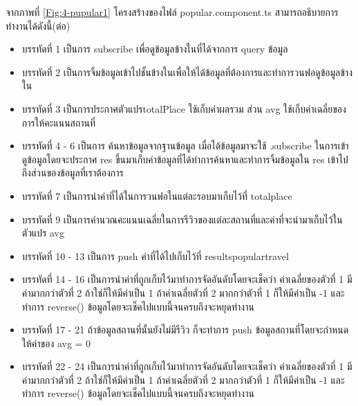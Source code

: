 จากภาพที่ \ref{Fig:4-pupular1} โครงสร้างของไฟล์ popular.component.ts สามารถอธิบายการทำงานได้ดังนี้(ต่อ)
\begin{itemize}[label={--}]
\item บรรทัดที่ 1 เป็นการ subscribe เพื่อดูข้อมูลข้างในที่ได้จากการ query ข้อมูล
\item บรรทัดที่ 2 เป็นการจิ้มข้อมูลเข้าไปชั้นข้างในเพื่อให้ได้ข้อมูลที่ต้องการและทำการวนฟอดูข้อมูลข้างใน
\item บรรทัดที่ 3 เป็นการประกาศตัวแปรtotalPlace ใช้เก็บค่าผลรวม ส่วน avg ใช้เก็บค่าเฉลี่ยของการให้คะแนนสถานที่
\item บรรทัดที่ 4 - 6 เป็นการ ค้นหาข้อมูลจากฐานข้อมูล เมื่อได้ข้อมูลมาจะใช้ .subscribe ในการเข้าดูข้อมูลโดยจะประกาศ res ขึ้นมาเก็บค่าข้อมูลที่ได้ทำการค้นหาและทำการจิ้มข้อมูลใน res เข้าไปถึงส่วนของข้อมูลที่เราต้องการ
\item บรรทัดที่ 7 เป็นการนำค่าที่ได้ในการวนฟอในแต่ละรอบมาเก็บไว้ที่ totalplace
\item บรรทัดที่ 9 เป็นการคำนวณคะแนนเฉลี่ยในการรีวิวของแต่ละสถานที่และค่าที่จะนำมาเก็บไว้ในตัวแปร avg
\item บรรทัดที่ 10 - 13 เป็นการ push ค่าที่ได้ไปเก็บไว้ที่ resultspopulartravel 
\item บรรทัดที่ 14 - 16 เป็นการนำค่าที่ถูกเก็บไว้มาทำการจัดอันดับโดยจะเช็คว่า ค่าเฉลี่ยของตัวที่ 1 มีค่ามากกว่าตัวที่ 2 ถ้าใช่ก็ให้มีค่าเป็น 1 ถ้าค่าเฉลี่ยตัวที่ 2 มากกว่าตัวที่ 1 ก็ให้มีค่าเป็น -1 และทำการ reverse() ข้อมูลโดยจะเช็คไปแบบนี้จนครบถึงจะหยุดทำงาน
\item บรรทัดที่ 17 - 21 ถ้าข้อมูลสถานที่นั้นยังไม่มีรีวิว ก็จะทำการ push ข้อมูลสถานที่โดยจะกำหนดให้ค่าของ avg = 0
\item บรรทัดที่ 22 - 24 เป็นการนำค่าที่ถูกเก็บไว้มาทำการจัดอันดับโดยจะเช็คว่า ค่าเฉลี่ยของตัวที่ 1 มีค่ามากกว่าตัวที่ 2 ถ้าใช่ก็ให้มีค่าเป็น 1 ถ้าค่าเฉลี่ยตัวที่ 2 มากกว่าตัวที่ 1 ก็ให้มีค่าเป็น -1 และทำการ reverse() ข้อมูลโดยจะเช็คไปแบบนี้จนครบถึงจะหยุดทำงาน
\end{itemize}
\newpage

